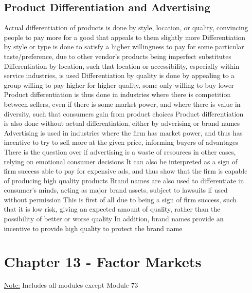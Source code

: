 \documentclass[11 pt, twoside]{article}
\newenvironment{outline*}
{
	\begin{outline}[enumerate]
	}
	{\end{outline}
}
\begin{document}
\subsection{Product Differentiation and Advertising}
\begin{outline*}
\1 Actual differentiation of products is done by style, location, or quality, convincing people to pay more for a good that appeals to them slightly more
\2 Differentiation by style or type is done to satisfy a higher willingness to pay for some particular taste/preference, due to other vendor's products being imperfect substitutes
\2 Differentiation by location, such that location or accessibility, especially within service industries, is used
\2 Differentiation by quality is done by appealing to a group willing to pay higher for higher quality, some only willing to buy lower
\1 Product differentiation is thus done in industries where there is competition between sellers, even if there is some market power, and where there is value in diversity, such that consumers gain from product choices
\1 Product differentiation is also done without actual differentiation, either by adverising or brand names
\2 Advertising is used in industries where the firm has market power, and thus has incentive to try to sell more at the given price, informing buyers of advantages
\3 There is the question over if advertising is a waste of resources in other cases, relying on emotional consumer decisions
\3 It can also be interpreted as a sign of firm success able to pay for expensive ads, and thus show that the firm is capable of producing high quality products
\2 Brand names are also used to differentiate in consumer's minds, acting as major brand assets, subject to lawsuits if used without permission
\3 This is first of all due to being a sign of firm success, such that it is low risk, giving an expected amount of quality, rather than the possibility of better or worse quality
\3 In addition, brand names provide an incentive to provide high quality to protect the brand name
\end{outline*}
\section{Chapter 13 - Factor Markets}
\underline{Note:} Includes all modules except Module 73
\end{document}
